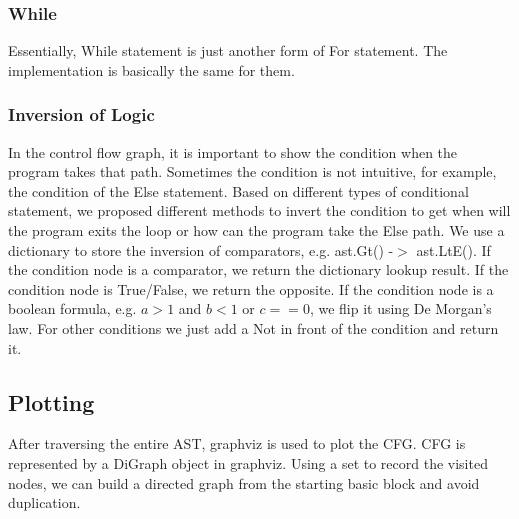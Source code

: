 \documentclass[11pt]{article}
\begin{document}
\subsubsection{While}
Essentially, While statement is just another form of For statement. The implementation is basically the same for them.

\subsubsection{Inversion of Logic}
In the control flow graph, it is important to show the condition when the program takes that path. Sometimes the condition is not intuitive, for example, the condition of the Else statement. Based on different types of conditional statement, we proposed different methods to invert the condition to get when will the program exits the loop or how can the program take the Else path. We use a dictionary to store the inversion of comparators, e.g. ast.Gt() -$>$ ast.LtE(). If the condition node is a comparator, we return the dictionary lookup result. If the condition node is True/False, we return the opposite. If the condition node is a boolean formula, e.g. $a>1$ and $b<1$ or $c==0$, we flip it using De Morgan's law. For other conditions we just add a Not in front of the condition and return it.

\subsection{Plotting}
After traversing the entire AST, graphviz is used to plot the CFG. CFG is represented by a DiGraph object in graphviz. Using a set to record the visited nodes, we can build a directed graph from the starting basic block and avoid duplication.
\end{document}

